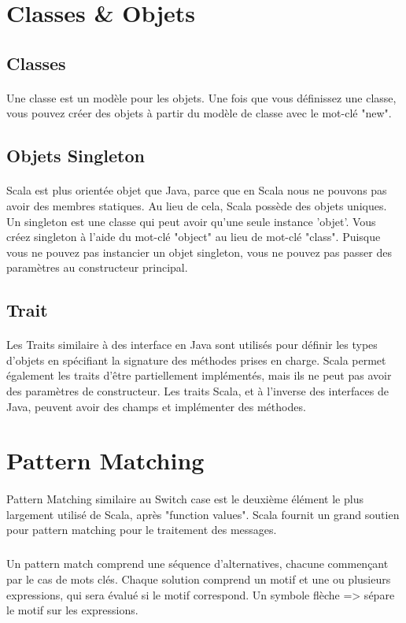 \section{Classes \& Objets}
\subsection{Classes}
\paragraph{}
Une classe est un modèle pour les objets. Une fois que vous définissez une classe, vous pouvez créer des objets à partir du modèle de classe avec le mot-clé "new".
\subsection{Objets Singleton}
\paragraph{}
Scala est plus orientée objet que Java, parce que en Scala nous ne pouvons pas avoir des membres statiques. Au lieu de cela, Scala possède des objets uniques. Un singleton est une classe qui peut avoir qu'une seule instance 'objet'. Vous créez singleton à l'aide du mot-clé "object" au lieu de mot-clé "class". Puisque vous ne pouvez pas instancier un objet singleton, vous ne pouvez pas passer des paramètres au constructeur principal.
\subsection{Trait}
\paragraph{}
Les Traits similaire à des interface en Java sont utilisés pour définir les types d'objets en spécifiant la signature des méthodes prises en charge. Scala permet également les traits d'être partiellement implémentés, mais ils ne peut pas avoir des paramètres de constructeur. Les traits Scala, et à l’inverse des interfaces de Java, peuvent avoir des champs et implémenter des méthodes.
\section{Pattern Matching}
\paragraph{}
Pattern Matching similaire au Switch case est le deuxième élément le plus largement utilisé de Scala, après "function values". Scala fournit un grand soutien pour pattern matching pour le traitement des messages.
\subparagraph{}
Un pattern match comprend une séquence d'alternatives, chacune commençant par le cas de mots clés. Chaque solution comprend un motif et une ou plusieurs expressions, qui sera évalué si le motif correspond. Un symbole flèche => sépare le motif sur les expressions.
